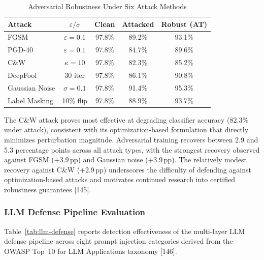 \documentclass[12pt,a4paper]{article}
\begin{document}
\begin{table}[!htbp]
\centering
\caption{Adversarial Robustness Under Six Attack Methods}
\label{tab:adversarial-robustness}
\renewcommand{\arraystretch}{1.15}
\begin{tabular}{@{}lcccc@{}}
\toprule
\textbf{Attack} & \textbf{$\varepsilon/\sigma$} & \textbf{Clean} & \textbf{Attacked} & \textbf{Robust (AT)} \\
\midrule
FGSM             & $\varepsilon{=}0.1$ & 97.8\% & 89.2\% & 93.1\% \\
PGD-40           & $\varepsilon{=}0.1$ & 97.8\% & 84.7\% & 89.6\% \\
C\&W             & $\kappa{=}10$       & 97.8\% & 82.3\% & 85.2\% \\
DeepFool         & 30 iter             & 97.8\% & 86.1\% & 90.8\% \\
Gaussian Noise   & $\sigma{=}0.1$      & 97.8\% & 91.4\% & 95.3\% \\
Label Masking    & 10\% flip           & 97.8\% & 88.9\% & 93.7\% \\
\bottomrule
\end{tabular}
\end{table}

The C\&W attack proves most effective at degrading classifier accuracy
(82.3\% under attack), consistent with its optimization-based formulation
that directly minimizes perturbation magnitude. Adversarial training
recovers between 2.9 and 5.3 percentage points across all attack types,
with the strongest recovery observed against FGSM (+3.9\,pp) and Gaussian
noise (+3.9\,pp). The relatively modest recovery against C\&W (+2.9\,pp)
underscores the difficulty of defending against optimization-based attacks
and motivates continued research into certified robustness guarantees [145].

\subsubsection{LLM Defense Pipeline Evaluation}

Table~\ref{tab:llm-defense} reports detection effectiveness of the
multi-layer LLM defense pipeline across eight prompt injection categories
derived from the OWASP Top~10 for LLM Applications taxonomy [146].
\end{document}
